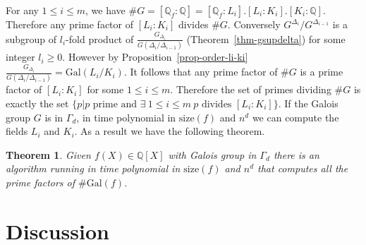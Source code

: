 \documentclass[11pt]{madras}%
\newtheorem{theorem}{Theorem}[chapter]
\theoremstyle{remark}
\newcommand{\Gal}[1]{{\ensuremath{\mathrm{Gal}\left(#1\right)}}}
\newcommand{\size}[1]{{\ensuremath{\mathrm{size}\left(#1\right)}}}
\newcommand{\Gof}[2][G]{{\ensuremath{#1\left(#2\right)}}}
\begin{document}
For any $1 \leq i \leq m$, we have $ \# G = [\mathbb{Q}_f:\mathbb{Q}]
= [\mathbb{Q}_f:L_i].[L_i:K_i].[K_i: \mathbb{Q}]$.  Therefore any
prime factor of $[L_i:K_i]$ divides $\# G$. Conversely
$G^{\Delta_i}/G^{\Delta_{i-1}}$ is a subgroup of $l_i$-fold product of
$\frac{G_{\Delta_i}}{\Gof{\Delta_i/\Delta_{i-1}}}$
(Theorem~\ref{thm-gsupdelta}) for some integer $l_i \geq 0$. However
by Proposition~\ref{prop-order-li-ki}
$\frac{G_{\Delta_i}}{\Gof{\Delta_i/\Delta_{i-1}}} = \Gal{L_i/K_i}$. It
follows that any prime factor of $\# G$ is a prime factor of
$[L_i:K_i]$ for some $1 \leq i \leq m$.  Therefore the set of primes
dividing $\#G$ is exactly the set $\{ p | p \textrm{ prime and }
\exists \ 1 \leq i \leq m \ p \textrm{ divides } [L_i:K_i] \}$. If the
Galois group $G$ is in $\Gamma_d$, in time polynomial in $\size{f}$
and $n^d$ we can compute the fields $L_i$ and $K_i$.  As a result we
have the following theorem.


\begin{theorem}\label{thm-gammad-primes}%
  Given $f(X) \in \mathbb{Q}[X]$ with Galois group in $\Gamma_d$ there
  is an algorithm running in time polynomial in $\size{f}$ and $n^d$
  that computes all the prime factors of $\# \Gal{f}$.
\end{theorem}


\section{Discussion}
\end{document}
